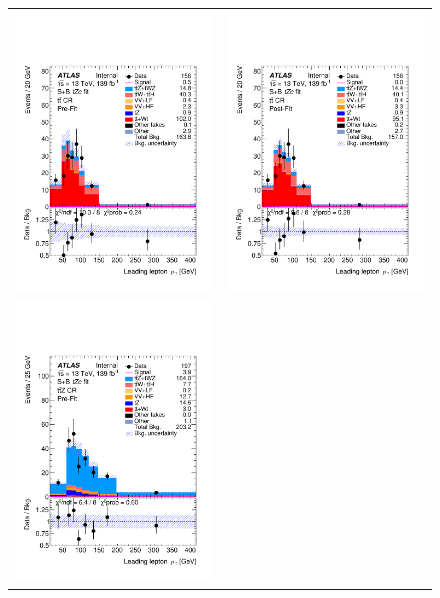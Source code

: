 \begin{figure}[htbp]
	\centering
	\begin{tabular}{cc}
		\includegraphics[width=.45\textwidth]{Chapters/CH8/figures/SPLUSB_CRSR_UsingDL1rcFullSys/Plots/TTCR} &
		\includegraphics[width=.45\textwidth]{Chapters/CH8/figures/SPLUSB_CRSR_UsingDL1rcFullSys/Plots/TTCR_postFit} \\
		\includegraphics[width=.45\textwidth]{Chapters/CH8/figures/SPLUSB_CRSR_UsingDL1rcFullSys/Plots/TTZCR} &

\end{tabular}
\end{figure}
